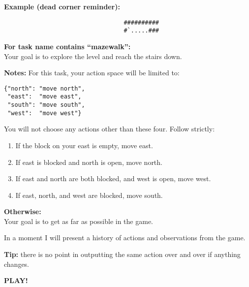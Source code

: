 \begin{MyGreenBox}
	\textbf{Example (dead corner reminder):} \begin{verbatim}
                                  ##########
                                  #`.....###
\end{verbatim}

	\textbf{For task name contains “mazewalk”:}\\ Your goal is to explore the
	level and reach the stairs down.

	\textbf{Notes:} For this task, your action space will be limited to: \begin{verbatim}
{"north": "move north",
 "east":  "move east",
 "south": "move south",
 "west":  "move west"}
\end{verbatim}

	You will not choose any actions other than these four. Follow strictly:
	\begin{enumerate}
		\item If the block on your east is empty, move east.

		\item If east is blocked and north is open, move north.

		\item If east and north are both blocked, and west is open, move west.

		\item If east, north, and west are blocked, move south.
	\end{enumerate}

	\textbf{Otherwise:}\\ Your goal is to get as far as possible in the game.

	In a moment I will present a history of actions and observations from the game.

	\textbf{Tip:} there is no point in outputting the same action over and over if
	anything changes.

	\textbf{PLAY!}
\end{MyGreenBox}

